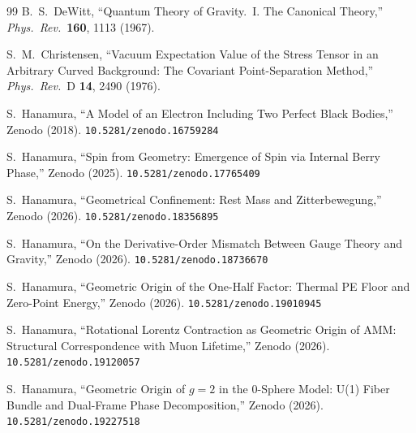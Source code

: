 \documentclass[12pt,letterpaper]{article}
\newcommand{\doilink}[1]{\texttt{#1}}
\begin{document}
\begin{thebibliography}{99}
B.~S.~DeWitt,
``Quantum Theory of Gravity.~I. The Canonical Theory,''
\textit{Phys.~Rev.}\ \textbf{160}, 1113 (1967).


S.~M.~Christensen,
``Vacuum Expectation Value of the Stress Tensor in an Arbitrary Curved
Background: The Covariant Point-Separation Method,''
\textit{Phys.~Rev.}~D \textbf{14}, 2490 (1976).

S.~Hanamura, ``A Model of an Electron Including Two Perfect Black Bodies,''
Zenodo (2018). \doilink{10.5281/zenodo.16759284}

S.~Hanamura, ``Spin from Geometry: Emergence of Spin via Internal Berry Phase,''
Zenodo (2025). \doilink{10.5281/zenodo.17765409}

S.~Hanamura, ``Geometrical Confinement: Rest Mass and Zitterbewegung,''
Zenodo (2026). \doilink{10.5281/zenodo.18356895}

S.~Hanamura, ``On the Derivative-Order Mismatch Between Gauge Theory and Gravity,''
Zenodo (2026). \doilink{10.5281/zenodo.18736670}

S.~Hanamura, ``Geometric Origin of the One-Half Factor: Thermal PE Floor
and Zero-Point Energy,'' Zenodo (2026). \doilink{10.5281/zenodo.19010945}

S.~Hanamura, ``Rotational Lorentz Contraction as Geometric Origin of AMM:
Structural Correspondence with Muon Lifetime,''
Zenodo (2026). \doilink{10.5281/zenodo.19120057}

S.~Hanamura, ``Geometric Origin of $g=2$ in the 0-Sphere Model:
U(1) Fiber Bundle and Dual-Frame Phase Decomposition,''
Zenodo (2026). \doilink{10.5281/zenodo.19227518}

\end{thebibliography}
\end{document}
